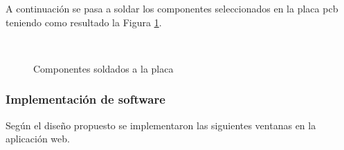 \newpage
A continuación se pasa a soldar los componentes seleccionados en la placa \acrshort{pcb} teniendo como resultado la Figura \ref{fig:pcbfin}.
\begin{figure}[hpt]
    \centering
    \caption{Componentes soldados a la placa}
            \qquad      %
        \\
    \label{fig:pcbfin}
\end{figure}
\newpage
\subsubsection{Implementación de software}
Según el diseño propuesto se implementaron las siguientes ventanas en la aplicación web.

